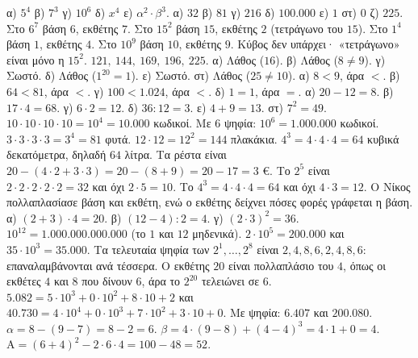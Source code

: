  α) $5^4$ β) $7^3$ γ) $10^6$ δ) $x^4$ ε) $\alpha^2\cdot\beta^3$.
 α) $32$ β) $81$ γ) $216$ δ) $100.000$ ε) $1$ στ) $0$ ζ) $225$.
 Στο $6^7$ βάση $6$, εκθέτης $7$. Στο $15^2$ βάση $15$, εκθέτης $2$ (τετράγωνο του $15$). Στο $1^4$ βάση $1$, εκθέτης $4$. Στο $10^9$ βάση $10$, εκθέτης $9$. Κύβος δεν υπάρχει· «τετράγωνο» είναι μόνο η $15^2$.
 $121,\ 144,\ 169,\ 196,\ 225$.
 α) Λάθος ($16$). β) Λάθος ($8\neq 9$). γ) Σωστό. δ) Λάθος ($1^{20}=1$). ε) Σωστό. στ) Λάθος ($25\neq 10$).
 α) $8<9$, άρα $<$. β) $64<81$, άρα $<$. γ) $100<1.024$, άρα $<$. δ) $1=1$, άρα $=$.
 α) $20-12=8$. β) $17\cdot 4=68$. γ) $6\cdot 2=12$. δ) $36:12=3$. ε) $4+9=13$. στ) $7^2=49$.
 $10\cdot 10\cdot 10\cdot 10=10^4=10.000$ κωδικοί. Με $6$ ψηφία: $10^6=1.000.000$ κωδικοί.
 $3\cdot 3\cdot 3\cdot 3=3^4=81$ φυτά.
 $12\cdot 12=12^2=144$ πλακάκια.
 $4^3=4\cdot 4\cdot 4=64$ κυβικά δεκατόμετρα, δηλαδή $64$ λίτρα.
 Τα ρέστα είναι $20-(4\cdot 2+3\cdot 3)=20-(8+9)=20-17=3$ €.
 Το $2^5$ είναι $2\cdot 2\cdot 2\cdot 2\cdot 2=32$ και όχι $2\cdot 5=10$. Το $4^3=4\cdot 4\cdot 4=64$ και όχι $4\cdot 3=12$. Ο Νίκος πολλαπλασίασε βάση και εκθέτη, ενώ ο εκθέτης δείχνει πόσες φορές γράφεται η βάση.
 α) $(2+3)\cdot 4=20$. β) $(12-4):2=4$. γ) $(2\cdot 3)^2=36$.
 $10^{12}=1.000.000.000.000$ (το $1$ και $12$ μηδενικά). $2\cdot 10^5=200.000$ και $35\cdot 10^3=35.000$.
 Τα τελευταία ψηφία των $2^1,\dots,2^8$ είναι $2,4,8,6,2,4,8,6$: επαναλαμβάνονται ανά τέσσερα. Ο εκθέτης $20$ είναι πολλαπλάσιο του $4$, όπως οι εκθέτες $4$ και $8$ που δίνουν $6$, άρα το $2^{20}$ τελειώνει σε $6$.
 $5.082=5\cdot 10^3+0\cdot 10^2+8\cdot 10+2$ και $40.730=4\cdot 10^4+0\cdot 10^3+7\cdot 10^2+3\cdot 10+0$. Με ψηφία: $6.407$ και $200.080$.
 $\alpha=8-(9-7)=8-2=6$. $\beta=4\cdot(9-8)+(4-4)^3=4\cdot 1+0=4$. $\mathrm{Α}=(6+4)^2-2\cdot 6\cdot 4=100-48=52$.
